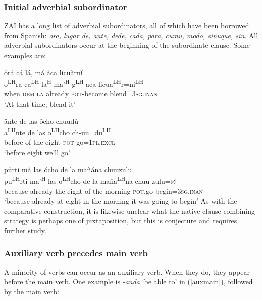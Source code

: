 \subsubsection{Initial adverbial subordinator}

ZAI has a long list of adverbial subordinators, all of which have been borrowed from Spanish: \textit{ora, lugar de, ante, dede, cada, para, cumu, modo, sinuque, sin}. All adverbial subordinators occur at the beginning of the subordinate clause. Some examples are:

\ea\label{ora}
\glll \v{o}r\'{a} c\'{a} l\'{a}, m\'{a} \'{a}ca licu\v{a}rn\v{i}  \\
o\textsuperscript{LH}ra ca\textsuperscript{LH} la\textsuperscript{H} ma'\textsuperscript{H} g\textsuperscript{LH}-aca licua\textsuperscript{LH}r=ni\textsuperscript{LH} \\
when \textsc{dem} \textsc{la} already \textsc{pot}-become blend=\textsc{3sg.inan} \\
\glt `At that time, blend it'
\z

\ea\label{ante}
\glll \v{a}nte de las \v{o}cho chuud\v{u}  \\
a\textsuperscript{LH}nte de las o\textsuperscript{LH}cho ch-uu=du\textsuperscript{LH} \\
before of the eight \textsc{pot}-go=\textsc{1pl.excl} \\
\glt `before eight we'll go'
\z

\ea\label{purti}
\glll p\v{u}rti m\'{a} las \v{o}cho de la ma\~{n}\v{a}na chuuzulu \\
pu\textsuperscript{LH}rti ma'\textsuperscript{H} las o\textsuperscript{LH}cho de la ma\~{n}a\textsuperscript{LH}na chuu-zulu=$\varnothing$ \\
because already the eight of the morning \textsc{pot}.go-begin=\textsc{3sg.inan} \\
\glt `because already at eight in the morning it was going to begin'
\z
As with the comparative construction, it is likewise unclear what the native clause-combining strategy is perhaps one of juxtaposition, but this is conjecture and requires further study.





\subsubsection{Auxiliary verb precedes main verb}
	
A minority of verbs can occur as an auxiliary verb. When they do, they appear before the main verb. One example is \textit{-anda} `be able to' in (\ref{auxmain}), followed by the main verb:

